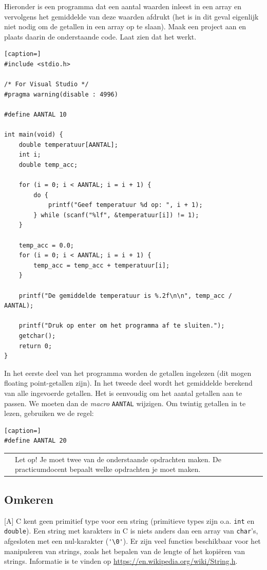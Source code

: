\documentclass[a4paper,10pt,fleqn,twoside]{article}
\newcommand{\letop}{%
\vspace{4ex plus 1ex minus 1ex}
\begin{mdframed}[outerlinewidth = 1 ,%
roundcorner = 4 pt,%
leftmargin = 40,%
rightmargin = 40,%
backgroundcolor = yellow!40,%
outerlinecolor = red!70!black,%
innertopmargin = \topskip,%
splittopskip = \topskip,%
]
\begin{tabularx}{\linewidth}{m{1cm}X}
\Large\leftpointright & Let op! Je moet twee van de onderstaande opdrachten maken. De practicumdocent bepaalt welke opdrachten je moet maken.
\end{tabularx}
\end{mdframed}
\vspace{4ex plus 1ex minus 1ex}
}
\begin{document}
Hieronder is een programma dat een aantal waarden inleest in een array en vervolgens het gemiddelde van deze waarden afdrukt (het is in dit geval eigenlijk niet nodig om de getallen in een array op te slaan). Maak een project aan en plaats daarin de onderstaande code. Laat zien dat het werkt.

\begin{lstlisting}[caption=]
#include <stdio.h>

/* For Visual Studio */
#pragma warning(disable : 4996)

#define AANTAL 10

int main(void) {
    double temperatuur[AANTAL];
    int i;
    double temp_acc;

    for (i = 0; i < AANTAL; i = i + 1) {
        do {
            printf("Geef temperatuur %d op: ", i + 1);
        } while (scanf("%lf", &temperatuur[i]) != 1);
    }

    temp_acc = 0.0;
    for (i = 0; i < AANTAL; i = i + 1) {
        temp_acc = temp_acc + temperatuur[i];
    }

    printf("De gemiddelde temperatuur is %.2f\n\n", temp_acc / AANTAL);

    printf("Druk op enter om het programma af te sluiten.");
    getchar();
    return 0;
}
\end{lstlisting}

In het eerste deel van het programma worden de getallen ingelezen (dit mogen floating point-getallen zijn). In het tweede deel wordt het gemiddelde berekend van alle ingevoerde getallen. Het is eenvoudig om het aantal getallen aan te passen. We moeten dan de \textsl{macro} \lstinline|AANTAL| wijzigen. Om twintig getallen in te lezen, gebruiken we de regel:

\begin{lstlisting}[caption=]
#define AANTAL 20
\end{lstlisting}

\letop
\clearpage

\subsection{Omkeren}[A]
C kent geen primitief type voor een string (primitieve types zijn o.a. \lstinline|int| en \lstinline|double|). Een string met karakters in C is niets anders dan een array van \lstinline|char|’s, afgesloten met een nul-karakter (\lstinline|'\0'|). Er zijn veel functies beschikbaar voor het manipuleren van strings, zoals het bepalen van de lengte of het kopiëren van strings. Informatie is te vinden op \url{https://en.wikipedia.org/wiki/String.h}.
\end{document}
